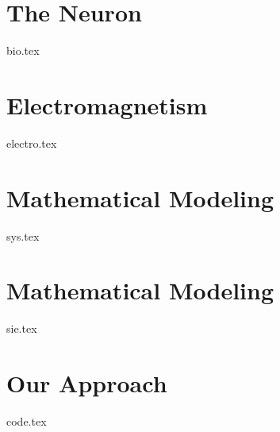 
\chapter{The Neuron}\label{ch:neuron}
{bio.tex}

\chapter{Electromagnetism}\label{ch:elemag}
{electro.tex}

\chapter{Mathematical Modeling}\label{ch:matmod}
{sys.tex}

\chapter{Mathematical Modeling}\label{ch:matmod}
{sie.tex}

\chapter{Our Approach}\label{ch:approa}
{code.tex}
